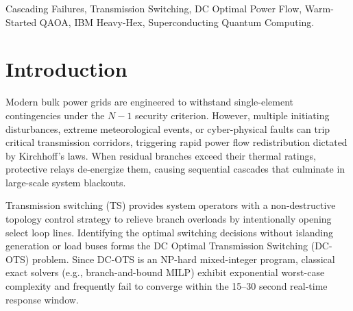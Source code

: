 \documentclass[conference]{IEEEtran}
\begin{document}
\begin{abstract}
Empirical evaluation on the IEEE 14-bus benchmark under realistic superconducting noise ($T_1/T_2$ thermal relaxation, $1.0 \times 10^{-2}$ two-qubit depolarizing error, and readout assignment errors) reveals that HG-WS-QAOA attains \textbf{13.16\% valid zero-violation sampling probability}, outperforming standard un-warm-started QAOA (6.59\%) by over \textbf{$2.1\times$} and exceeding uniform random guessing (9.38\%). Furthermore, the hardware-aligned sparsification slashes native two-qubit gate count by \textbf{84.0\% (from 94 to 15 gates)} and circuit depth by \textbf{72.4\% (from 199 to 55)}, demonstrating the operational viability of hybrid quantum computing for near-real-time smart grid resilience.
\end{abstract}

\begin{IEEEkeywords}
Cascading Failures, Transmission Switching, DC Optimal Power Flow, Warm-Started QAOA, IBM Heavy-Hex, Superconducting Quantum Computing.
\end{IEEEkeywords}

\section{Introduction}
Modern bulk power grids are engineered to withstand single-element contingencies under the $N-1$ security criterion. However, multiple initiating disturbances, extreme meteorological events, or cyber-physical faults can trip critical transmission corridors, triggering rapid power flow redistribution dictated by Kirchhoff's laws. When residual branches exceed their thermal ratings, protective relays de-energize them, causing sequential cascades that culminate in large-scale system blackouts.

Transmission switching (TS) provides system operators with a non-destructive topology control strategy to relieve branch overloads by intentionally opening select loop lines. Identifying the optimal switching decisions without islanding generation or load buses forms the DC Optimal Transmission Switching (DC-OTS) problem. Since DC-OTS is an NP-hard mixed-integer program, classical exact solvers (e.g., branch-and-bound MILP) exhibit exponential worst-case complexity and frequently fail to converge within the 15--30 second real-time response window.
\end{document}
